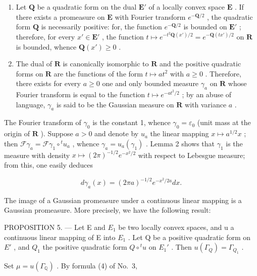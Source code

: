 \begin{enumerate}
\def\labelenumi{\arabic{enumi})}
\setcounter{enumi}{1}
\item
  Let \(\mathbf{Q}\) be a quadratic form on the dual \(\mathbf{E}'\) of a locally convex space \(\mathbf{E}\) . If there exists a promeasure on \(\mathbf{E}\) with Fourier transform \(e^{-\mathbf{Q} / 2}\) , the quadratic form \(\mathbf{Q}\) is necessarily positive: for, the function \(e^{-\mathbf{Q} / 2}\) is bounded on \(\mathbf{E}'\) ; therefore, for every \(x' \in \mathbf{E}'\) , the function \(t \mapsto e^{-t^2\mathbf{Q}(x') / 2} = e^{-\mathbf{Q}(tx') / 2}\) on \(\mathbf{R}\) is bounded, whence \(\mathbf{Q}(x') \geqslant 0\) .
\item
  The dual of \(\mathbf{R}\) is canonically isomorphic to \(\mathbf{R}\) and the positive quadratic forms on \(\mathbf{R}\) are the functions of the form \(t \mapsto at^2\) with \(a \geqslant 0\) . Therefore, there exists for every \(a \geqslant 0\) one and only bounded measure \(\gamma_a\) on \(\mathbf{R}\) whose Fourier transform is equal to the function \(t \mapsto e^{-at^2/2}\) ; by an abuse of language, \(\gamma_a\) is said to be the Gaussian measure on \(\mathbf{R}\) with variance \(a\) .
\end{enumerate}

The Fourier transform of \(\gamma_0\) is the constant 1, whence \(\gamma_0 = \varepsilon_0\) (unit mass at the origin of \(\mathbf{R}\) ). Suppose \(a > 0\) and denote by \(u_a\) the linear mapping \(x \mapsto a^{1/2}x\) ; then \(\mathcal{F}\gamma_a = \mathcal{F}\gamma_1 \circ {}^t u_a\) , whence \(\gamma_a = u_a(\gamma_1)\) . Lemma 2 shows that \(\gamma_1\) is the measure with density \(x \mapsto (2\pi)^{-1/2} e^{-x^2/2}\) with respect to Lebesgue measure; from this, one easily deduces

\[
d \gamma_ {a} (x) = (2 \pi a) ^ {- 1 / 2} e ^ {- x ^ {2} / 2 a} d x.\tag{15}
\]

The image of a Gaussian promeasure under a continuous linear mapping is a Gaussian promeasure. More precisely, we have the following result:

PROPOSITION 5. --- Let E and \(E_{1}\) be two locally convex spaces, and u a continuous linear mapping of E into \(E_{1}\) . Let Q be a positive quadratic form on \(E'\) , and \(Q_{1}\) the positive quadratic form \(Q \circ {}^{t}u\) on \(E_{1}'\) . Then \(u(\Gamma_{Q}) = \Gamma_{Q_{1}}\) .

Set \(\mu = u(\Gamma_{\mathbb{Q}})\) . By formula (4) of No.~3,

